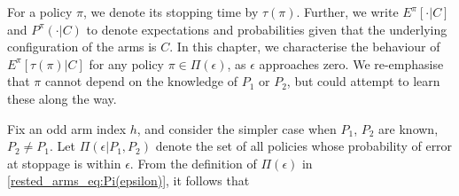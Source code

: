 For a policy $\pi$, we denote its stopping time by $\tau(\pi)$.
 Further, we write $E^\pi[\cdot|C]$ and $P^\pi(\cdot|C)$ to denote expectations and probabilities given that the underlying configuration of the arms is $C$. In this chapter, we characterise the behaviour of $E^\pi[\tau(\pi)|C]$ for any policy $\pi\in\Pi(\epsilon)$, as $\epsilon$ approaches zero. We re-emphasise that $\pi$ cannot depend on the knowledge of $P_1$ or $P_2$, but could attempt to learn these along the way.

 \begin{remark}
Fix an odd arm index $h$, and consider the simpler case when $P_1$, $P_2$ are known, $P_2\neq P_1$. Let $\Pi(\epsilon|P_1,P_2)$ denote the set of all policies whose probability of error at stoppage is within $\epsilon$. From the definition of $\Pi(\epsilon)$ in \eqref{rested_arms_eq:Pi(epsilon)}, it follows that

\end{remark}
